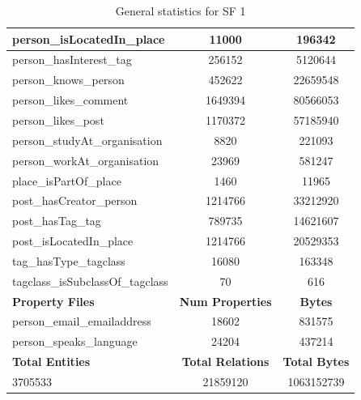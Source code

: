 \begin{table}[H]
\begin{tabular} {| l | c | c |}
        \hline
        person\_isLocatedIn\_place & 11000 & 196342 \\
        \hline
        person\_hasInterest\_tag & 256152 & 5120644 \\
        \hline
        person\_knows\_person & 452622 & 22659548 \\
        \hline
        person\_likes\_comment & 1649394 & 80566053 \\
        \hline
        person\_likes\_post & 1170372 & 57185940 \\
        \hline
        person\_studyAt\_organisation & 8820 & 221093 \\
        \hline
        person\_workAt\_organisation & 23969 & 581247 \\
        \hline
        place\_isPartOf\_place & 1460 & 11965 \\
        \hline
        post\_hasCreator\_person & 1214766 & 33212920 \\
        \hline
        post\_hasTag\_tag & 789735 & 14621607 \\
        \hline
        post\_isLocatedIn\_place & 1214766 & 20529353 \\
        \hline
        tag\_hasType\_tagclass & 16080 & 163348 \\
        \hline
        tagclass\_isSubclassOf\_tagclass & 70 & 616 \\
        \hline
        \hline
        \textbf{Property Files} & \textbf{Num Properties} & \textbf{Bytes} \\
        \hline
        \hline
        person\_email\_emailaddress & 18602 & 831575 \\
        \hline
        person\_speaks\_language & 24204 & 437214 \\
        \hline
        \hline
        \textbf{Total Entities} & \textbf{Total Relations} & \textbf{Total Bytes} \\
        \hline
        \hline
        3705533 & 21859120 & 1063152739 \\
        \hline
    \end{tabular}
    \caption{General statistics for SF 1}
\end{table}


